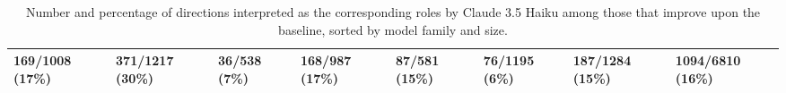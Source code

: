 \begin{table*}[ht]
{{\begin{tabular}{lllllll|l}
\cellcolor{blue!8} 169/1008 (17\%) & \cellcolor{blue!15} 371/1217 (30\%) & \cellcolor{blue!3} 36/538 (7\%) & \cellcolor{blue!8} 168/987 (17\%) & \cellcolor{blue!7} 87/581 (15\%) & \cellcolor{blue!3} 76/1195 (6\%) & \cellcolor{blue!7} 187/1284 (15\%) & \cellcolor{blue!8} 1094/6810 (16\%) \\
\bottomrule
\end{tabular}
}}
\caption{ Number and percentage of directions interpreted as the corresponding roles by Claude 3.5 Haiku among those that improve upon the baseline, sorted by model family and size.}
\label{tab:percentage}
\end{table*}